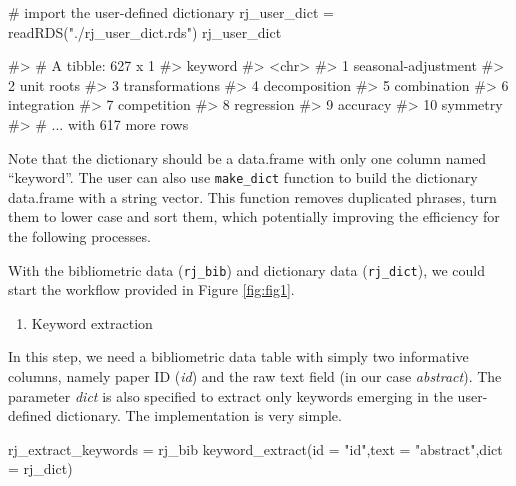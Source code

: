 \begin{Schunk}
\begin{Sinput}
# import the user-defined dictionary
rj_user_dict = readRDS("./rj_user_dict.rds")
rj_user_dict
\end{Sinput}
\begin{Soutput}
#> # A tibble: 627 x 1
#>    keyword            
#>    <chr>              
#>  1 seasonal-adjustment
#>  2 unit roots         
#>  3 transformations    
#>  4 decomposition      
#>  5 combination        
#>  6 integration        
#>  7 competition        
#>  8 regression         
#>  9 accuracy           
#> 10 symmetry           
#> # ... with 617 more rows
\end{Soutput}
\end{Schunk}

Note that the dictionary should be a data.frame with only one column
named ``keyword''. The user can also use \texttt{make\_dict} function to
build the dictionary data.frame with a string vector. This function
removes duplicated phrases, turn them to lower case and sort them, which
potentially improving the efficiency for the following processes.

\begin{Schunk}
\end{Schunk}

With the bibliometric data (\texttt{rj\_bib}) and dictionary data
(\texttt{rj\_dict}), we could start the workflow provided in Figure
\ref{fig:fig1}.

\begin{enumerate}
\def\labelenumi{(\arabic{enumi})}
\tightlist
\item
  Keyword extraction
\end{enumerate}

In this step, we need a bibliometric data table with simply two
informative columns, namely paper ID (\emph{id}) and the raw text field
(in our case \emph{abstract}). The parameter \emph{dict} is also
specified to extract only keywords emerging in the user-defined
dictionary. The implementation is very simple.

\begin{Schunk}
\begin{Sinput}
rj_extract_keywords = rj_bib %
  keyword_extract(id = "id",text = "abstract",dict = rj_dict)
\end{Sinput}
\end{Schunk}

